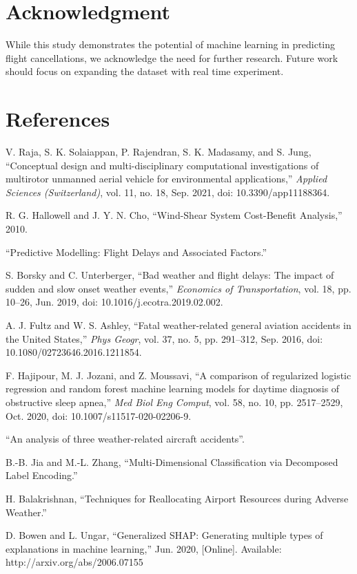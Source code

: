 \documentclass[conference]{IEEEtran}
\begin{document}
\section{Acknowledgment}\label{sec7}
While this study demonstrates the potential of machine learning in predicting flight cancellations, we acknowledge the need for further research. Future work should focus on expanding the dataset with real time experiment.

\section{References}\label{sec7}
\noindent [1] V. Raja, S. K. Solaiappan, P. Rajendran, S. K. Madasamy, and S. Jung, ``Conceptual design and multi-disciplinary computational investigations of multirotor unmanned aerial vehicle for environmental applications,'' \textit{Applied Sciences (Switzerland)}, vol. 11, no. 18, Sep. 2021, doi: 10.3390/app11188364.

\noindent [2] R. G. Hallowell and J. Y. N. Cho, ``Wind-Shear System Cost-Benefit Analysis,'' 2010.

\noindent [3] ``Predictive Modelling: Flight Delays and Associated Factors.''

\noindent [4] S. Borsky and C. Unterberger, ``Bad weather and flight delays: The impact of sudden and slow onset weather events,'' \textit{Economics of Transportation}, vol. 18, pp. 10--26, Jun. 2019, doi: 10.1016/j.ecotra.2019.02.002.

\noindent [5] A. J. Fultz and W. S. Ashley, ``Fatal weather-related general aviation accidents in the United States,'' \textit{Phys Geogr}, vol. 37, no. 5, pp. 291--312, Sep. 2016, doi: 10.1080/02723646.2016.1211854.

\noindent [6] F. Hajipour, M. J. Jozani, and Z. Moussavi, ``A comparison of regularized logistic regression and random forest machine learning models for daytime diagnosis of obstructive sleep apnea,'' \textit{Med Biol Eng Comput}, vol. 58, no. 10, pp. 2517--2529, Oct. 2020, doi: 10.1007/s11517-020-02206-9.

\noindent [7] ``An analysis of three weather-related aircraft accidents''.

\noindent [8] B.-B. Jia and M.-L. Zhang, ``Multi-Dimensional Classification via Decomposed Label Encoding.''

\noindent [9] H. Balakrishnan, ``Techniques for Reallocating Airport Resources during Adverse Weather.''

\noindent [10] D. Bowen and L. Ungar, ``Generalized SHAP: Generating multiple types of explanations in machine learning,'' Jun. 2020, [Online]. Available: http://arxiv.org/abs/2006.07155
\end{document}
